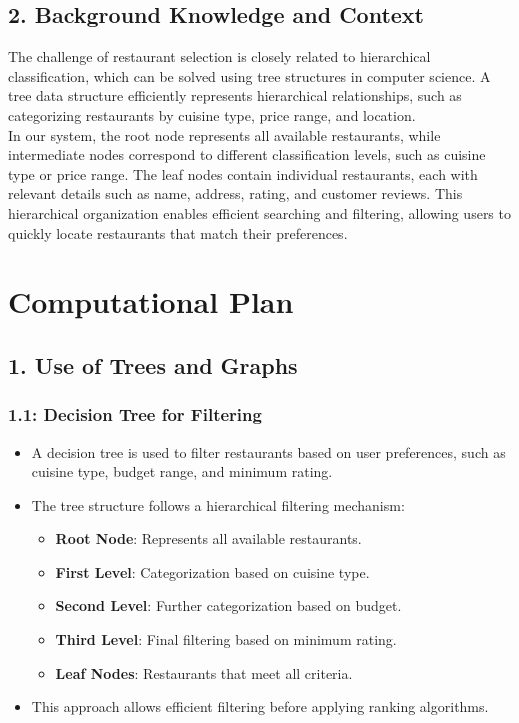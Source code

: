 \documentclass[fontsize=11pt]{article}
\begin{document}
\subsection*{2. Background Knowledge and Context}
The challenge of restaurant selection is closely related to hierarchical classification, which can be solved using tree structures in computer science. A tree data structure efficiently represents hierarchical relationships, such as categorizing restaurants by cuisine type, price range, and location. \\
In our system, the root node represents all available restaurants, while intermediate nodes correspond to different classification levels, such as cuisine type or price range. The leaf nodes contain individual restaurants, each with relevant details such as name, address, rating, and customer reviews. This hierarchical organization enables efficient searching and filtering, allowing users to quickly locate restaurants that match their preferences.


\section*{Computational Plan}

\subsection*{1. Use of Trees and Graphs}

\subsubsection*{1.1: Decision Tree for Filtering}
\begin{itemize}
    \item A decision tree is used to filter restaurants based on user preferences, such as cuisine type, budget range, and minimum rating.
    \item The tree structure follows a hierarchical filtering mechanism: 
    \begin{itemize}
        \item \textbf{Root Node}: Represents all available restaurants.
        \item \textbf{First Level}: Categorization based on cuisine type.
        \item \textbf{Second Level}: Further categorization based on budget.
        \item \textbf{Third Level}: Final filtering based on minimum rating.
        \item \textbf{Leaf Nodes}: Restaurants that meet all criteria.
    \end{itemize}
    \item This approach allows efficient filtering before applying ranking algorithms.
\end{itemize}
\end{document}
